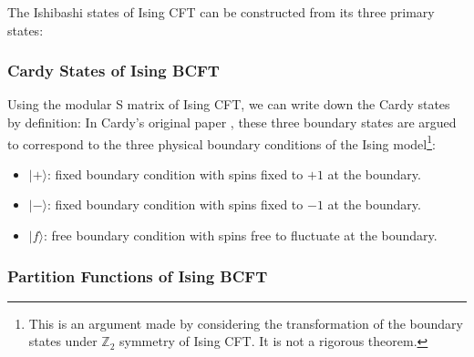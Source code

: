The Ishibashi states of Ising CFT can be constructed from its three primary states:

\subsubsection{Cardy States of Ising BCFT}

 Using the modular S matrix of Ising CFT, we can write down the Cardy states by definition:
In Cardy's original paper \cite{cardyBoundaryConditionsFusion1989}, these three boundary states are argued to correspond to the three physical boundary conditions of the Ising model\footnote{This is an argument made by considering the transformation of the boundary states under $ \mathbb{Z}_2 $ symmetry of Ising CFT. It is not a rigorous theorem.}:
\begin{itemize}
  \item $|+\rangle$: fixed boundary condition with spins fixed to $+1$ at the boundary.
  \item $|-\rangle$: fixed boundary condition with spins fixed to $-1$ at the boundary.
  \item $|f\rangle$: free boundary condition with spins free to fluctuate at the boundary.
\end{itemize}

\subsubsection{Partition Functions of Ising BCFT}

